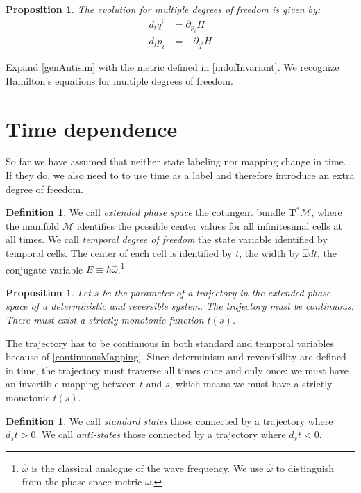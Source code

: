 \documentclass[aps,pra,10pt,twocolumn,floatfix,nofootinbib]{revtex4-1}
\newtheorem{prop}[thm]{Proposition}
\theoremstyle{definition}
\newtheorem{defn}[thm]{Definition}
\begin{document}
\begin{prop}\label{mdofHam}
The evolution for multiple degrees of freedom is given by:
\begin{align*}
d_{t}q^i &= \partial_{p_i} H \\
d_{t}p_i &= - \partial_{q^i} H
\end{align*}
\end{prop}

Expand \ref{genAntisim} with the metric defined in \ref{mdofInvariant}. We recognize Hamilton's equations for multiple degrees of freedom\cite{classical_dynamics}.

\section{Time dependence}

So far we have assumed that neither state labeling nor mapping change in time. If they do, we also need to to use time as a label and therefore introduce an extra degree of freedom.

\begin{defn}\label{tdof}
We call \emph{extended phase space} the cotangent bundle $\mathbf{T}^*\mathcal{M}$, where the manifold $\mathcal{M}$ identifies the possible center values for all infinitesimal cells at all times. We call \emph{temporal degree of freedom} the state variable identified by temporal cells. The center of each cell is identified by $t$, the width by $\hat{\omega} dt$, the conjugate variable $E\equiv\hbar\hat{\omega}$.\footnote{$\hat{\omega}$ is the classical analogue of the wave frequency. We use $\hat{\omega}$ to distinguish from the phase space metric $\omega$.}
\end{defn}

\begin{prop}\label{tdofMonotonic}
Let $s$ be the parameter of a trajectory in the extended phase space of a deterministic and reversible system. The trajectory must be continuous. There must exist a strictly monotonic function $t(s)$.
\end{prop}

The trajectory has to be continuous in both standard and temporal variables because of \ref{continuousMapping}. Since determinism and reversibility are defined in time, the trajectory must traverse all times once and only once: we must have an invertible mapping between $t$ and $s$, which means we must have a strictly monotonic $t(s)$.

\begin{defn}\label{tdofAntistates}
We call \emph{standard states} those connected by a trajectory where $d_{s}t>0$. We call \emph{anti-states} those connected by a trajectory where $d_{s}t<0$.
\end{defn}
\end{document}
